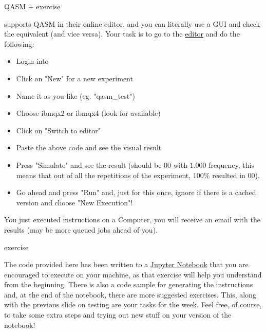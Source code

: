 \documentclass[aspectratio=43]{beamer}
\begin{document}
\begin{frame}[fragile]{QASM + \ibmqe exercise}
\small{
    \href{https://quantumexperience.ng.bluemix.net/qx/experience}{\ibmqe} supports QASM in their online editor, and you can literally use a GUI and check the \qasm equivalent (and vice versa).  Your task is to go to the \href{https://quantumexperience.ng.bluemix.net/qx/editor}{editor} and do the following:
    \begin{itemize}
        \itemsep0em
        \item Login into \ibmqe
        \item Click on "New" for a new experiment
        \item Name it as you like (eg. "qasm\_test")
        \item Choose ibmqx2 or ibmqx4 (look for available)
        \item Click on "Switch to \qasm editor"
        \item Paste the above \qasm code and see the visual result
        \item Press "Simulate" and see the result (should be $00$ with $1.000$ frequency, this means that out of all the repetitions of the experiment, $100\%$ resulted in $00$).
        \item Go ahead and press "Run" and, just for this once, ignore if there is a cached version and choose "New Execution"!
    \end{itemize}
    You just executed instructions on a \q Computer, you will receive an email with the results (may be more queued jobs ahead of you).
}
\end{frame}

\begin{frame}{\qk exercise}
    \begin{card}
    The code provided here has been written to a \href{\weekTwo/exercises/w2_01.ipynb}{Jupyter Notebook} that you are encouraged to execute on your machine, as that exercise will help you understand \qk from the beginning. There is also a code sample for generating the \qasm instructions and, at the end of the notebook, there are more suggested exercises. This, along with the previous slide on testing \ibmqe are your tasks for the week. Feel free, of course, to take some extra steps and trying out new stuff on your version of the notebook!
    \end{card}
\pagenumber
\end{frame}



\end{document}
